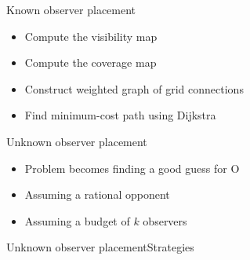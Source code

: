 \begin{frame}{Known observer placement}
	\begin{itemize}
		\item Compute the visibility map
		\item Compute the coverage map
		\item Construct weighted graph of grid connections
		\item Find minimum-cost path  using Dijkstra
	\end{itemize}
\end{frame}

\begin{frame}{Unknown observer placement}
	\begin{itemize}
		\item Problem becomes finding a good guess for O
		\item Assuming a rational opponent
		\item Assuming a budget of $k$ observers
	\end{itemize}
\end{frame}

\begin{frame}{Unknown observer placement}{Strategies}
	\begin{itemize}
	\end{itemize}
\end{frame}
